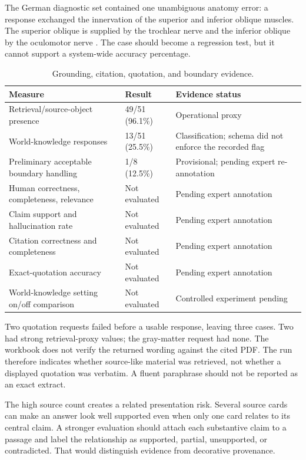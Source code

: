 The German diagnostic set contained one unambiguous anatomy error: a response exchanged the innervation of the superior and inferior oblique muscles. The superior oblique is supplied by the trochlear nerve and the inferior oblique by the oculomotor nerve \parencite{purves2001extraocular}. The case should become a regression test, but it cannot support a system-wide accuracy percentage.

\begin{table}[htbp]
  \centering
  \caption{Grounding, citation, quotation, and boundary evidence.}
  \label{tab:grounding-results}
  \scriptsize
  \begin{tabularx}{\textwidth}{L{0.31\textwidth}L{0.22\textwidth}Y}
    \toprule
    Measure & Result & Evidence status \\
    \midrule
    Retrieval/source-object presence & 49/51 (96.1\%) & Operational proxy \\
    World-knowledge responses & 13/51 (25.5\%) & Classification; schema did not enforce the recorded flag \\
    Preliminary acceptable boundary handling & 1/8 (12.5\%) & Provisional; pending expert re-annotation \\
    Human correctness, completeness, relevance & Not evaluated & Pending expert annotation \\
    Claim support and hallucination rate & Not evaluated & Pending expert annotation \\
    Citation correctness and completeness & Not evaluated & Pending expert annotation \\
    Exact-quotation accuracy & Not evaluated & Pending expert annotation \\
    World-knowledge setting on/off comparison & Not evaluated & Controlled experiment pending \\
    \bottomrule
  \end{tabularx}
\end{table}

Two quotation requests failed before a usable response, leaving three cases. Two had strong retrieval-proxy values; the gray-matter request had none. The workbook does not verify the returned wording against the cited PDF. The run therefore indicates whether source-like material was retrieved, not whether a displayed quotation was verbatim. A fluent paraphrase should not be reported as an exact extract.

The high source count creates a related presentation risk. Several source cards can make an answer look well supported even when only one card relates to its central claim. A stronger evaluation should attach each substantive claim to a passage and label the relationship as supported, partial, unsupported, or contradicted. That would distinguish evidence from decorative provenance.

